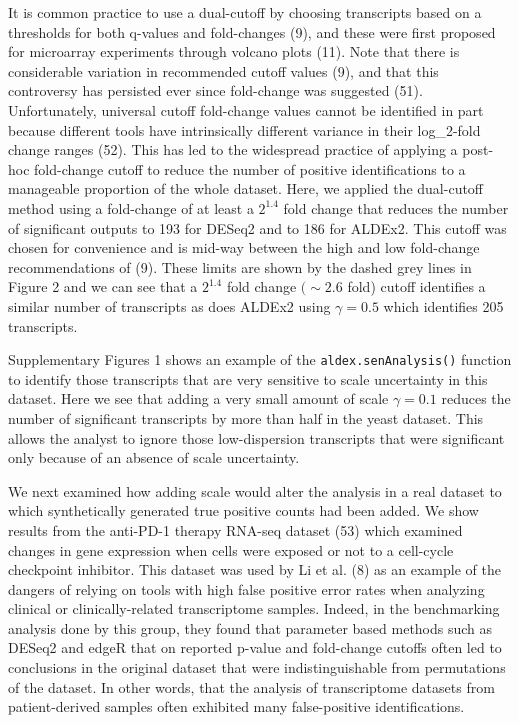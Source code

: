 \documentclass[
]{article}
\begin{document}
It is common practice to use a dual-cutoff by choosing transcripts based
on a thresholds for both q-values and fold-changes (9), and these were
first proposed for microarray experiments through volcano plots (11).
Note that there is considerable variation in recommended cutoff values
(9), and that this controversy has persisted ever since fold-change was
suggested (51). Unfortunately, universal cutoff fold-change values
cannot be identified in part because different tools have intrinsically
different variance in their log\_2-fold change ranges (52). This has led
to the widespread practice of applying a post-hoc fold-change cutoff to
reduce the number of positive identifications to a manageable proportion
of the whole dataset. Here, we applied the dual-cutoff method using a
fold-change of at least a \(2^{1.4}\) fold change that reduces the
number of significant outputs to 193 for DESeq2 and to 186 for ALDEx2.
This cutoff was chosen for convenience and is mid-way between the high
and low fold-change recommendations of (9). These limits are shown by
the dashed grey lines in Figure 2 and we can see that a \(2^{1.4}\) fold
change \((\sim 2.6\) fold) cutoff identifies a similar number of
transcripts as does ALDEx2 using \(\gamma = 0.5\) which identifies 205
transcripts.

Supplementary Figures 1 shows an example of the
\texttt{aldex.senAnalysis()} function to identify those transcripts that
are very sensitive to scale uncertainty in this dataset. Here we see
that adding a very small amount of scale \(\gamma = 0.1\) reduces the
number of significant transcripts by more than half in the yeast
dataset. This allows the analyst to ignore those low-dispersion
transcripts that were significant only because of an absence of scale
uncertainty.

We next examined how adding scale would alter the analysis in a real
dataset to which synthetically generated true positive counts had been
added. We show results from the anti-PD-1 therapy RNA-seq dataset (53)
which examined changes in gene expression when cells were exposed or not
to a cell-cycle checkpoint inhibitor. This dataset was used by Li et al.
(8) as an example of the dangers of relying on tools with high false
positive error rates when analyzing clinical or clinically-related
transcriptome samples. Indeed, in the benchmarking analysis done by this
group, they found that parameter based methods such as DESeq2 and edgeR
that on reported p-value and fold-change cutoffs often led to
conclusions in the original dataset that were indistinguishable from
permutations of the dataset. In other words, that the analysis of
transcriptome datasets from patient-derived samples often exhibited many
false-positive identifications.
\end{document}
